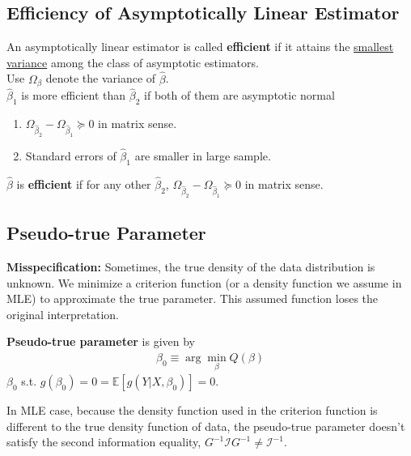 \documentclass[11pt]{elegantbook}
\begin{document}
\subsection{Efficiency of Asymptotically Linear Estimator}
\begin{definition}
    \normalfont
    An asymptotically linear estimator is called \textbf{efficient} if it attains the \underline{smallest variance} among the class of asymptotic estimators.\\
    Use $\Omega_{\beta}$ denote the variance of $\hat{\beta}$.\\
    $\hat{\beta}_1$ is more efficient than $\hat{\beta}_2$ if both of them are asymptotic normal
    \begin{enumerate}[$\cdot$]
        \item $\Omega_{\hat{\beta}_2}-\Omega_{\hat{\beta}_1}\succeq 0$ in matrix sense.
        \item Standard errors of $\hat{\beta}_1$ are smaller in large sample.
    \end{enumerate}
    $\hat{\beta}$ is \textbf{efficient} if for any other $\hat{\beta}_2$, $\Omega_{\hat{\beta}_2}-\Omega_{\hat{\beta}_1}\succeq 0$ in matrix sense.
\end{definition}


\subsection{Pseudo-true Parameter}
\textbf{Misspecification:} Sometimes, the true density of the data distribution is unknown. We minimize a criterion function (or a density function we assume in MLE) to approximate the true parameter. This assumed function loses the original interpretation.
\begin{definition}
\normalfont
    \textbf{Pseudo-true parameter} is given by
    \begin{equation}
        \begin{aligned}
            \beta_0\equiv \arg\min_\beta Q(\beta)
        \end{aligned}
        \nonumber
    \end{equation}
    $\beta_0$ s.t. $g(\beta_0)=0=\mathbb{E}[g(Y|X,\beta_0)]=0$.
\end{definition}
In MLE case, because the density function used in the criterion function is different to the true density function of data, the pseudo-true parameter doesn't satisfy the second information equality, $G^{-1}\mathcal{I}G^{-1}\neq \mathcal{I}^{-1}$.
\end{document}
